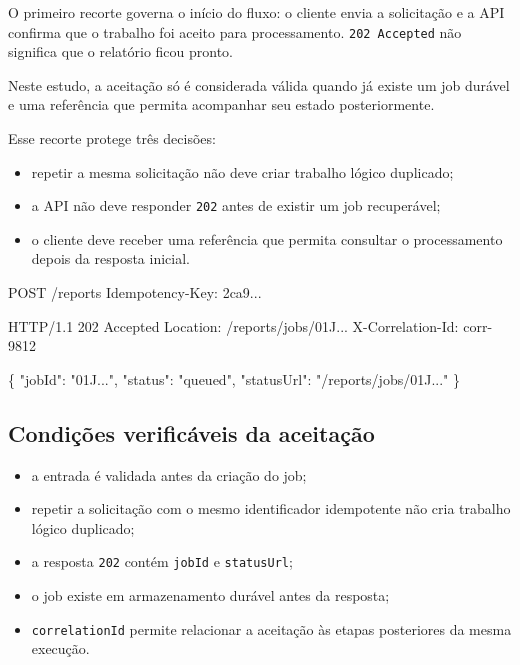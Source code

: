 \documentclass[
  10pt,
  a4paper,
  oneside]{book}
\newenvironment{Shaded}{}{}
\newcommand{\NormalTok}[1]{#1}
\providecommand{\tightlist}{%
  \setlength{\itemsep}{0pt}\setlength{\parskip}{0pt}}
\renewenvironment{Shaded}{\begin{snugshade}}{\end{snugshade}}%
\begin{document}
O primeiro recorte governa o início do fluxo: o cliente envia a
solicitação e a API confirma que o trabalho foi aceito para
processamento. \texttt{202\ Accepted} não significa que o relatório
ficou pronto.

Neste estudo, a aceitação só é considerada válida quando já existe um
job durável e uma referência que permita acompanhar seu estado
posteriormente.

Esse recorte protege três decisões:

\begin{itemize}
\tightlist
\item
  repetir a mesma solicitação não deve criar trabalho lógico duplicado;
\item
  a API não deve responder \texttt{202} antes de existir um job
  recuperável;
\item
  o cliente deve receber uma referência que permita consultar o
  processamento depois da resposta inicial.
\end{itemize}

\begin{Shaded}
\begin{Highlighting}[]
\NormalTok{POST /reports}
\NormalTok{Idempotency{-}Key: 2ca9...}

\NormalTok{HTTP/1.1 202 Accepted}
\NormalTok{Location: /reports/jobs/01J...}
\NormalTok{X{-}Correlation{-}Id: corr{-}9812}

\NormalTok{\{}
\NormalTok{  "jobId": "01J...",}
\NormalTok{  "status": "queued",}
\NormalTok{  "statusUrl": "/reports/jobs/01J..."}
\NormalTok{\}}
\end{Highlighting}
\end{Shaded}

\hypertarget{condiuxe7uxf5es-verificuxe1veis-da-aceitauxe7uxe3o}{%
\subsection{Condições verificáveis da
aceitação}\label{condiuxe7uxf5es-verificuxe1veis-da-aceitauxe7uxe3o}}

\begin{itemize}
\tightlist
\item
  a entrada é validada antes da criação do job;
\item
  repetir a solicitação com o mesmo identificador idempotente não cria
  trabalho lógico duplicado;
\item
  a resposta \texttt{202} contém \texttt{jobId} e \texttt{statusUrl};
\item
  o job existe em armazenamento durável antes da resposta;
\item
  \texttt{correlationId} permite relacionar a aceitação às etapas
  posteriores da mesma execução.
\end{itemize}
\end{document}
